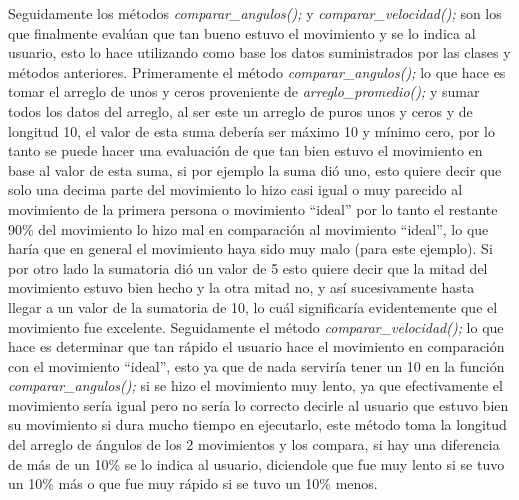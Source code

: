 \documentclass[letterpaper]{article}
\begin{document}
Seguidamente los métodos \textit{comparar\_angulos();} y \textit{comparar\_velocidad();} son los que finalmente evalúan que tan bueno estuvo el movimiento y se lo indica al usuario, esto lo hace utilizando como base los datos suministrados por las clases y métodos anteriores. Primeramente el método \textit{comparar\_angulos();} lo que hace es tomar el arreglo de unos y ceros proveniente de \textit{arreglo\_promedio();} y sumar todos los datos del arreglo, al ser este un arreglo de puros unos y ceros y de longitud 10, el valor de esta suma debería ser máximo 10 y mínimo cero, por lo tanto se puede hacer una evaluación de que tan bien estuvo 
el movimiento en base al valor de esta suma, si por ejemplo la suma dió uno, esto quiere decir que solo una decima parte del movimiento lo hizo casi igual o muy parecido al movimiento de la primera persona o movimiento ``ideal'' por lo tanto el restante 90\% del movimiento lo hizo mal en comparación al movimiento ``ideal'', lo que haría que en general el movimiento haya sido muy malo (para este ejemplo). Si por otro lado la sumatoria dió un valor de 5 esto quiere decir que la mitad del movimiento estuvo bien hecho y la otra mitad no, y así sucesivamente hasta llegar a un valor de la sumatoria de 10, lo cuál significaría evidentemente que el movimiento fue excelente. Seguidamente el método \textit{comparar\_velocidad();} 
lo que hace es determinar que tan rápido el usuario hace el movimiento en comparación con el movimiento ``ideal'', esto ya que de nada serviría tener un 10 en la función \textit{comparar\_angulos();} si se hizo el movimiento muy lento, ya que efectivamente el movimiento sería igual pero no sería lo correcto decirle al usuario que estuvo bien su movimiento si dura mucho tiempo en ejecutarlo, este método toma la longitud del arreglo de ángulos de los 2 movimientos y los compara, si hay una diferencia de más de un 10\% se lo indica al usuario, diciendole que fue muy lento si se tuvo un 10\% más o que fue muy rápido si se tuvo un 10\% menos. \\
\end{document}

